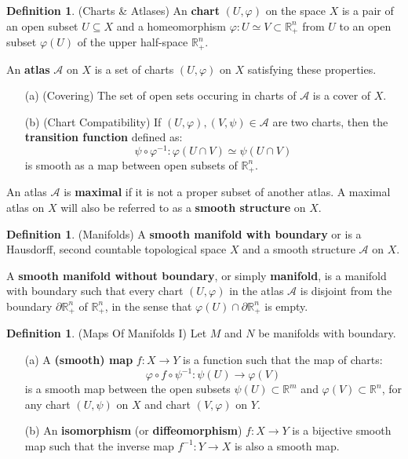 \documentclass[12pt]{article}
\theoremstyle{definition}
\newtheorem{definition}[theorem]{Definition}
\numberwithin{equation}{section}
\newcommand{\R}{{\mathbb R}}
\begin{document}
\begin{definition} \label{def:charts_atlases} (Charts \& Atlases) An {\bf chart} $(U,\varphi)$ on the space $X$ is a pair of an open subset $U \subseteq X$ and a homeomorphism $\varphi:U \simeq V \subset \R^n_+$ from $U$ to an open subset $\varphi(U)$ of the upper half-space $\R^n_+$.

An {\bf atlas} $\mathcal{A}$ on $X$ is a set of charts $(U,\varphi)$ on $X$  satisfying these properties.
\begin{itemize} 
	\item[(a)] (Covering) The set of open sets occuring in charts of $\mathcal{A}$ is a cover of $X$.
	\item[(b)] (Chart Compatibility) If $(U,\varphi),(V,\psi) \in \mathcal{A}$ are two charts, then the {\bf transition function} defined as:
	\[\psi \circ \varphi^{-1}:\varphi(U \cap V) \simeq \psi(U \cap V)\]
	is smooth as a map between open subsets of $\R^n_+$.
\end{itemize}
An atlas $\mathcal{A}$ is {\bf maximal} if it is not a proper subset of another atlas. A maximal atlas on $X$ will also be referred to as a {\bf smooth structure} on $X$.
\end{definition}

\begin{definition} (Manifolds) \label{def:manifold} A {\bf smooth manifold with boundary} or is a Hausdorff, second countable topological space $X$ and a smooth structure $\mathcal{A}$ on $X$. 

A {\bf smooth manifold without boundary}, or simply {\bf manifold}, is a manifold with boundary such that every chart $(U,\varphi)$ in the atlas $\mathcal{A}$ is disjoint from the boundary $\partial \R^n_+$ of $\R^n_+$, in the sense that $\varphi(U) \cap \partial \R^n_+$ is empty. 
\end{definition}



\begin{definition} \label{def:maps_of_manifolds} (Maps Of Manifolds I) Let $M$ and $N$ be manifolds with boundary. 

\begin{itemize}
	\item[(a)] A {\bf (smooth) map} $f:X \to Y$ is a function such that the map of charts:
	\[\varphi \circ f \circ \psi^{-1}:\psi(U) \to \varphi(V)\]
	is a smooth map between the open subsets $\psi(U) \subset \R^m$ and $\varphi(V) \subset \R^n$, for any chart $(U,\psi)$ on $X$ and chart $(V,\varphi)$ on $Y$. 
	\item[(b)] An {\bf isomorphism} (or {\bf diffeomorphism}) $f:X \to Y$ is a bijective smooth map such that the inverse map $f^{-1}:Y \to X$ is also a smooth map.
\end{itemize}
\end{definition}
\end{document}
